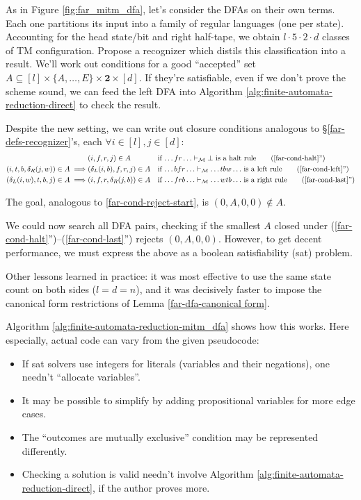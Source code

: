 As in Figure \ref{fig:far_mitm_dfa}, let's consider the DFAs on their own terms.
Each one partitions its input into a family of regular languages (one per state).
Accounting for the head state/bit and right half-tape, we obtain $l\cdot 5\cdot 2\cdot d$ classes of TM configuration.
Propose a recognizer which distils this classification into a result.
We'll work out conditions for a good ``accepted'' set $A\subseteq[l]\times\{A,\ldots,E\}\times\mathbf{2}\times[d]$.
If they're satisfiable, even if we don't prove the scheme sound, we can feed the left DFA into Algorithm \ref{alg:finite-automata-reduction-direct} to check the result.

Despite the new setting, we can write out closure conditions analogous to \S\ref{far-defs-recognizer}'s, each $\forall i\in[l],j\in[d]$:
\begin{align}
  &(i,f,r,j)\in A
  &&\text{if $\ldots fr\ldots\vdash_\mathcal{M}\bot$ is a halt rule}
  \tag{\ref{far-cond-halt}''}
  \\
  (i, t, b, \delta_R(j,w))\in A \implies& (\delta_L(i,b), f, r, j)\in A
  &&\text{if $\ldots bfr\ldots\vdash_\mathcal{M}\ldots tbw\ldots$ is a left rule}
  \tag{\ref{far-cond-left}''}
  \\
  (\delta_L(i,w), t, b, j)\in A \implies& (i, f, r, \delta_R(j,b))\in A
  &&\text{if $\ldots frb\ldots\vdash_\mathcal{M}\ldots wtb\ldots$ is a right rule}
  \tag{\ref{far-cond-last}''}
\end{align}

The goal, analogous to \eqref{far-cond-reject-start}, is $(0, A, 0, 0)\notin A$.

We could now search all DFA pairs, checking if the smallest $A$ closed under (\ref{far-cond-halt}'')--(\ref{far-cond-last}'') rejects $(0,A,0,0)$.
However, to get decent performance, we must express the above as a boolean satisfiability ({\sc sat}) problem.

Other lessons learned in practice:
it was most effective to use the same state count on both sides ($l=d=n$),
and it was decisively faster to impose the canonical form restrictions of Lemma \ref{far-dfa-canonical form}.

Algorithm \ref{alg:finite-automata-reduction-mitm_dfa} shows how this works.
Here especially, actual code can vary from the given pseudocode:
\begin{itemize}
  \item If {\sc sat} solvers use integers for literals (variables and their negations), one needn't ``allocate variables''.
  \item It may be possible to simplify by adding propositional variables for more edge cases.
  \item The ``outcomes are mutually exclusive'' condition may be represented differently.
  \item Checking a solution is valid needn't involve Algorithm \ref{alg:finite-automata-reduction-direct}, if the author proves more.
\end{itemize}

